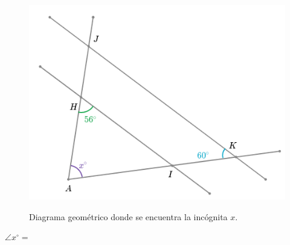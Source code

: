     \begin{minipage}[b]{0.43\textwidth}
        \begin{figure}[H]
            \caption{Diagrama geométrico donde se encuentra la inc\'ognita $x$.}
            \includegraphics[width=\linewidth]{Images/triangle_angle_04}
            \label{fig:triangle_angle_04}
        \end{figure}
        {
            \color{purplePoint}\textbf{$\angle x^\circ =$}} \fbox{
            \begin{minipage}{2cm}
                \hfill\vspace{0.5cm}
            \end{minipage}
        }
    \end{minipage}
